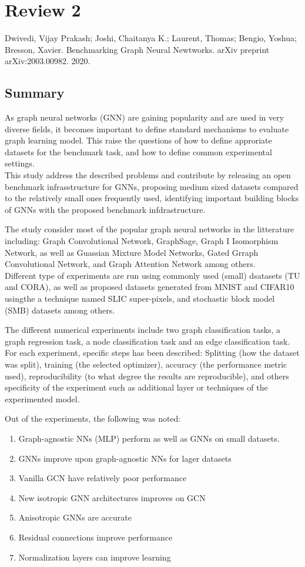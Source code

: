 \documentclass{article}
\begin{document}
\section*{Review 2}
Dwivedi, Vijay Prakash; Joshi, Chaitanya K.; Laurent, Thomas; Bengio, Yoshua;
Bresson, Xavier. Benchmarking Graph Neural Newtworks. arXiv preprint 
arXiv:2003.00982. 2020.

\subsection*{Summary}
As graph neural networks (GNN) are gaining popularity and are used in very 
diverse fields, it becomes important to define standard mechanisms to evaluate 
graph learning model. This raise the questions of how to define approriate 
datasets for the benchmark task, and how to define common experimental 
settings.\\
This study address the described problems and contribute by releasing an 
open benchmark infrasstructure for GNNs, proposing medium sized datasets 
compared to the relatively small ones frequently used, identifying important
building blocks of GNNs with the proposed benchmark infdrastructure.

The study consider most of the popular graph neural networks in the 
litterature including: Graph Convolutional Network, GraphSage, Graph I
Isomorphism Network, as well as Guassian Mixture Model Networks, 
Gated Grraph Convolutional Network, and Graph Attention Network among 
others.\\
Different type of experiments are run using commonly used (small) dsatasets 
(TU and CORA), as well as proposed datasets generated from MNIST and CIFAR10
usingthe a technique named SLIC super-pixels, and stochastic block model (SMB)
datasets among others.

The different numerical experiments include two graph classification tasks, 
a graph regression task, a node classification task and an edge classification
task. For each experiment, specific steps has been described: Splitting 
(how the dataset was split), training (the selected optimizer), accuracy 
(the performance metric used), reproducibility (to what degree the results 
are reproducible), and others specificity of the experiment such as additional
layer or techniques of the experimented model.

Out of the experiments, the following was noted: 
\begin{enumerate}
	\item Graph-agnostic NNs (MLP) perform as well as GNNs on small datasets.
	\item GNNs improve upon graph-agnostic NNs for lager datasets
	\item Vanilla GCN have relatively poor performance
	\item New isotropic GNN architectures improves on GCN
	\item Anisotropic GNNs are accurate
	\item Residual connections improve performance
	\item Normalization layers can improve learning
\end{enumerate}
\end{document}
